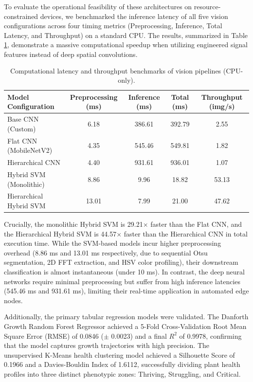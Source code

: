 \documentclass[11pt,a4paper]{article}
\begin{document}
To evaluate the operational feasibility of these architectures on resource-constrained devices, we benchmarked the inference latency of all five vision configurations across four timing metrics (Preprocessing, Inference, Total Latency, and Throughput) on a standard CPU. The results, summarized in Table \ref{tab:latency}, demonstrate a massive computational speedup when utilizing engineered signal features instead of deep spatial convolutions.

\begin{table}[H]
\centering
\begin{tabular}{|l|c|c|c|c|}
\hline
\textbf{Model Configuration} & \textbf{Preprocessing (ms)} & \textbf{Inference (ms)} & \textbf{Total (ms)} & \textbf{Throughput (img/s)} \\ \hline
Base CNN (Custom) & 6.18 & 386.61 & 392.79 & 2.55 \\ \hline
Flat CNN (MobileNetV2) & 4.35 & 545.46 & 549.81 & 1.82 \\ \hline
Hierarchical CNN & 4.40 & 931.61 & 936.01 & 1.07 \\ \hline
Hybrid SVM (Monolithic) & 8.86 & 9.96 & 18.82 & 53.13 \\ \hline
Hierarchical Hybrid SVM & 13.01 & 7.99 & 21.00 & 47.62 \\ \hline
\end{tabular}
\caption{Computational latency and throughput benchmarks of vision pipelines (CPU-only).}
\label{tab:latency}
\end{table}

Crucially, the monolithic Hybrid SVM is 29.21$\times$ faster than the Flat CNN, and the Hierarchical Hybrid SVM is 44.57$\times$ faster than the Hierarchical CNN in total execution time. While the SVM-based models incur higher preprocessing overhead (8.86 ms and 13.01 ms respectively, due to sequential Otsu segmentation, 2D FFT extraction, and HSV color profiling), their downstream classification is almost instantaneous (under 10 ms). In contrast, the deep neural networks require minimal preprocessing but suffer from high inference latencies (545.46 ms and 931.61 ms), limiting their real-time application in automated edge nodes.

Additionally, the primary tabular regression models were validated. The Danforth Growth Random Forest Regressor achieved a 5-Fold Cross-Validation Root Mean Square Error (RMSE) of 0.0846 ($\pm$ 0.0023) and a final $R^2$ of 0.9978, confirming that the model captures growth trajectories with high precision. The unsupervised K-Means health clustering model achieved a Silhouette Score of 0.1966 and a Davies-Bouldin Index of 1.6112, successfully dividing plant health profiles into three distinct phenotypic zones: Thriving, Struggling, and Critical.
\end{document}
